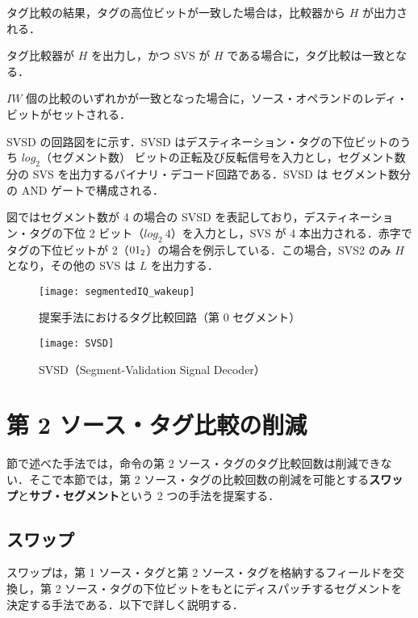 タグ比較の結果，タグの高位ビットが一致した場合は，比較器から $H$ が出力される．

タグ比較器が $H$ を出力し，かつ SVS が $H$ である場合に，タグ比較は一致となる．

$IW$ 個の比較のいずれかが一致となった場合に，ソース・オペランドのレディ・ビットがセットされる．

SVSD の回路図をに示す．SVSD はデスティネーション・タグの下位ビットのうち $log_2（セグメント数）$ ビットの正転及び反転信号を入力とし，セグメント数分の SVS を出力するバイナリ・デコード回路である．SVSD は セグメント数分の AND ゲートで構成される．

図ではセグメント数が 4 の場合の SVSD を表記しており，デスティネーション・タグの下位 2 ビット（$log_2\:4$）を入力とし，SVS が 4 本出力される．赤字でタグの下位ビットが 2（${\rm 01_2}$）の場合を例示している．この場合，SVS2 のみ $H$ となり，その他の SVS は $L$ を出力する． 


\begin{figure}[thb]
  \centering
  \texttt{[image: segmentedIQ\_wakeup]}
  \caption{提案手法におけるタグ比較回路（第 0 セグメント）}
  \label{fig:segmentedIQ_wakeup}
\end{figure}

\begin{figure}[htb]
  \centering
  \texttt{[image: SVSD]}
  \caption{SVSD（Segment-Validation Signal Decoder）}
  \label{fig:SVSD}
\end{figure}

\clearpage

\section{第 2 ソース・タグ比較の削減}
\label{sec:second_tag_comp}
節で述べた手法では，命令の第 2 ソース・タグのタグ比較回数は削減できない．そこで本節では，第 2 ソース・タグの比較回数の削減を可能とする\textbf{スワップ}と\textbf{サブ・セグメント}という 2 つの手法を提案する．

\subsection{スワップ}
\label{sec:swap}
スワップは，第 1 ソース・タグと第 2 ソース・タグを格納するフィールドを交換し，第 2 ソース・タグの下位ビットをもとにディスパッチするセグメントを決定する手法である．以下で詳しく説明する．

